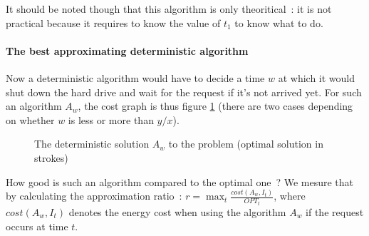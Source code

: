It should be noted though that this algorithm is only theoritical~: it is not practical because it requires to know the value of $t_1$ to know what to do.

\paragraph{The best approximating deterministic algorithm}

Now a deterministic algorithm would have to decide a time $w$ at which it would shut down the hard drive and wait for the request if it's not arrived yet. For such an algorithm $A_w$, the cost graph is thus figure \ref{fig2} (there are two cases depending on whether $w$ is less or more than $y/x$).

\begin{figure}
	\centering
		\hspace{1cm}
	\caption{The deterministic solution $A_w$ to the problem (optimal solution in strokes)} \label{fig2}
\end{figure}

\medskip

How good is such an algorithm compared to the optimal one~? We mesure that by calculating the approximation ratio~: $r = \max_t{\frac{cost(A_w, I_t)}{OPT_t}}$, where $cost(A_w, I_t)$ denotes the energy cost when using the algorithm $A_w$ if the request occurs at time $t$.

